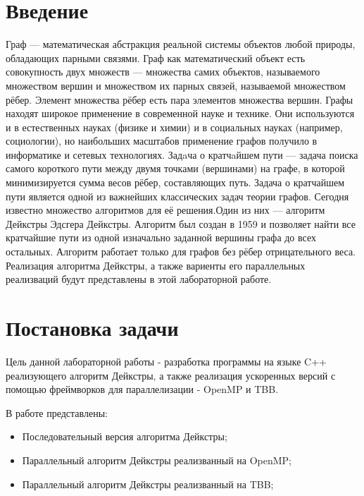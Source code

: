 \documentclass{report}
\begin{document}
\setcounter{page}{2}

\tableofcontents
\newpage

\section*{Введение}
Граф — математическая абстракция реальной системы объектов любой природы, обладающих парными связями. Граф как математический объект есть совокупность двух множеств —
множества самих объектов, называемого множеством вершин и множеством их парных связей, называемой множеством рёбер. Элемент множества рёбер есть пара элементов множества вершин.
Графы находят широкое применение в современной науке и технике. Они используются и в естественных науках (физике и химии) и в социальных науках (например, социологии),
но наибольших масштабов применение графов получило в информатике и сетевых технологиях.
Задaча о кратчaйшем пути — задача поиска самого короткого пути между двумя точками (вершинами) на графе,
в которой минимизируется сумма весов рёбер, составляющих путь. Задача о кратчайшем пути является одной из важнейших классических задач теории графов. Сегодня известно множество алгоритмов для её решения.Один из них — алгоритм Дейкстры
Эдсгера Дейкстры. Алгоритм был создан в 1959 и позволяет найти все кратчайшие пути из одной изначально заданной вершины графа до всех остальных. Алгоритм работает только для графов без рёбер отрицательного веса.
Реализация алгоритма Дейкстры, а также вариенты его параллельных реализваций будут представлены в этой лабораторной работе.
\newpage

\section*{Постановка задачи}
Цель данной лабораторной работы - разработка программы на языке C++ реализующего алгоритм Дейкстры, а также реализация ускоренных версий с помощью фреймворков для параллелизации - OpenMP и TBB.
\par В работе представлены:
\begin{itemize}
\item Последовательный версия алгоритма Дейкстры;
\item Параллельный алгоритм Дейкстры реализванный на OpenMP;
\item Параллельный алгоритм Дейкстры реализванный на TBB;
\end{itemize}
\newpage
\end{document}

